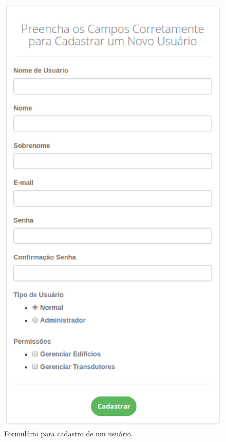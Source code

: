 \begin{apendicesenv}
\begin{figure}[!htpb]
    \centering
    \includegraphics[keepaspectratio=true,scale=0.8]{figuras/img3.eps}
    \caption{Formulário para cadastro de um usuário.}
    \label{img3}
\end{figure}


\end{apendicesenv}
